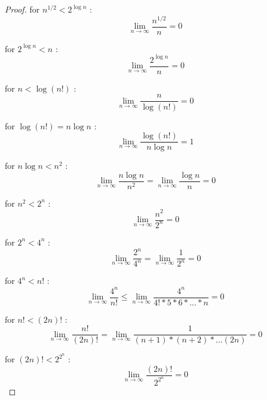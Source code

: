 \documentclass[12pt,a4paper]{article}
\theoremstyle{definition}
\begin{document}
\begin{enumerate}
\begin{proof}
        for $n^{1/2} < 2^{\log n}$ :
    \begin{equation}
        \lim_{n \to \infty} \frac{n^{1/2}}{n} = 0
    \end{equation}
    
        for $2^{\log n} < n$ :
    \begin{equation}
        \lim_{n \to \infty} \frac{2^{\log n}}{n} = 0
    \end{equation}
    
        for $n < \log (n!)$ :
    \begin{equation}
        \lim_{n \to \infty} \frac{n}{\log (n!)} = 0
    \end{equation}
    
        for $\log (n!) = n \log n$ :
    \begin{equation}
        \lim_{n \to \infty} \frac{\log(n!)}{n \log n} = 1
    \end{equation}
    
        for $n \log n < n^2$ :
    \begin{equation}
        \lim_{n \to \infty} \frac{n \log n}{n^2} =  \lim_{n \to \infty} \frac{\log n}{n} = 0
    \end{equation}
    
        for $n^2 < 2^n$ :
    \begin{equation}
        \lim_{n \to \infty} \frac{n^2}{2^n} = 0
    \end{equation}
    
        for $2^n < 4^n$ :
    \begin{equation}
        \lim_{n \to \infty} \frac{2^n}{4^n} =  \lim_{n \to \infty} \frac{1}{2^n} = 0
    \end{equation}
    
        for $4^n < n!$ :
    \begin{equation}
        \lim_{n \to \infty} \frac{4^n}{n!} \leq \lim_{n \to \infty} \frac{4^n}{4!*5*6*...*n} = 0
    \end{equation}
    
        for $n! < (2n)!$ :
    \begin{equation}
        \lim_{n \to \infty} \frac{n!}{(2n)!} = \lim_{n \to \infty} \frac{1}{(n+1)*(n+2)*...(2n)} = 0
    \end{equation}
    
        for $(2n)! < 2^{2^n} $ :
    \begin{equation}
        \lim_{n \to \infty} \frac{(2n)!}{2^{2^n}} = 0
    \end{equation}
    
    \end{proof}


\end{enumerate}
\end{document}
